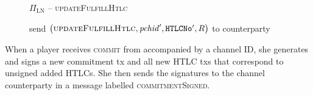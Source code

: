 \begin{figure}[H]
\begin{protocolbox}{$\Pi_{\mathrm{LN}}$ -- \textsc{updateFulfillHtlc}}
\begin{algorithmic}[1]
              \State {}
              \State send $\left(\textsc{updateFulfillHtlc}, \mathit{pchid}',
              \mathtt{HTLCNo}', R\right)$ to counterparty
            \EndIf
        \EndIndent
      \end{algorithmic}
    \end{protocolbox}
    \caption{}
    \label{alg:protocol:pay:updateFulfillHtlc}
  \end{figure}

  When a player receives \textsc{commit} from \environment{} accompanied by a
  channel ID, she generates and signs a new commitment tx and all new HTLC
  txs that correspond to unsigned added HTLCs. She then sends the signatures to
  the channel counterparty in a message labelled \textsc{commitmentSigned}.

